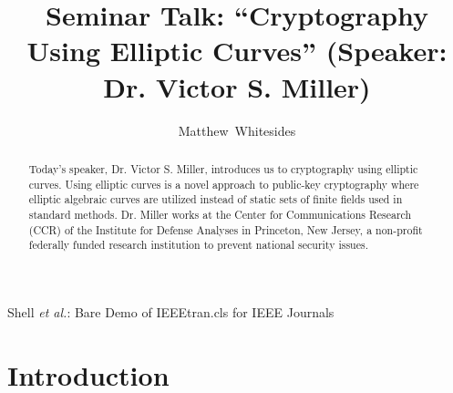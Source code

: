 \documentclass[journal,onecolumn]{IEEEtran}
\begin{document}
%
\title{Seminar Talk: ``Cryptography Using Elliptic Curves'' (Speaker: Dr. Victor S. Miller)}

%
%
%
\author{Matthew~Whitesides}%

%
{Shell \MakeLowercase{\textit{et al.}}: Bare Demo of IEEEtran.cls for IEEE Journals}

\maketitle

\begin{abstract}
  Today's speaker, Dr. Victor S. Miller, introduces us to cryptography using elliptic curves. Using elliptic curves is a novel approach to public-key cryptography where elliptic algebraic curves are utilized instead of static sets of finite fields used in standard methods. Dr. Miller works at the Center for Communications Research (CCR) of the Institute for Defense Analyses in Princeton, New Jersey, a non-profit federally funded research institution to prevent national security issues. 
\end{abstract}


\IEEEpeerreviewmaketitle

\section{Introduction}
\end{document}
